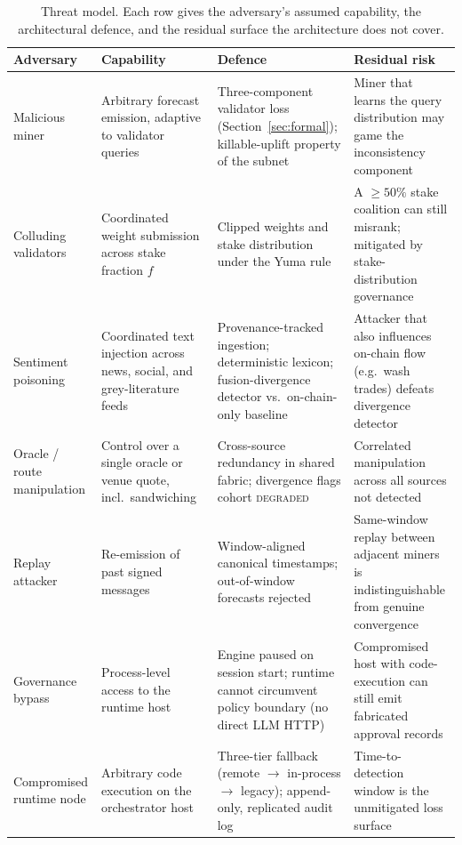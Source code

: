 \documentclass[11pt,a4paper]{article}
\begin{document}
\begin{table}[ht]
\centering
\footnotesize
\caption{Threat model. Each row gives the adversary's assumed
capability, the architectural defence, and the residual surface the
architecture does not cover.}
\label{tab:threat-model}
\renewcommand{\arraystretch}{1.15}
\begin{tabularx}{\linewidth}{@{}l Y Y Y@{}}
\toprule
\textbf{Adversary} & \textbf{Capability} & \textbf{Defence} &
\textbf{Residual risk} \\
\midrule
Malicious miner & Arbitrary forecast emission, adaptive to validator
queries & Three-component validator loss
(Section~\ref{sec:formal}); killable-uplift property of the subnet
& Miner that learns the query distribution may game the inconsistency
component \\
Colluding validators & Coordinated weight submission across stake
fraction $f$ & Clipped weights and stake distribution under the Yuma
rule & A $\geq 50\%$ stake coalition can still misrank; mitigated by
stake-distribution governance \\
Sentiment poisoning & Coordinated text injection across news, social,
and grey-literature feeds & Provenance-tracked ingestion;
deterministic lexicon; fusion-divergence detector vs.\ on-chain-only
baseline & Attacker that also influences on-chain flow (e.g.\ wash
trades) defeats divergence detector~\cite{cong2022crypto} \\
Oracle / route manipulation & Control over a single oracle or venue
quote, incl.\ sandwiching~\cite{daian2020flash} & Cross-source
redundancy in shared fabric; divergence flags cohort
\textsc{degraded} & Correlated manipulation across all sources not
detected \\
Replay attacker & Re-emission of past signed messages
& Window-aligned canonical timestamps; out-of-window forecasts
rejected & Same-window replay between adjacent miners is
indistinguishable from genuine convergence \\
Governance bypass & Process-level access to the runtime host
& Engine paused on session start; runtime cannot circumvent policy
boundary (no direct LLM HTTP) & Compromised host with code-execution
can still emit fabricated approval records \\
Compromised runtime node & Arbitrary code execution on the
orchestrator host & Three-tier fallback (remote $\to$ in-process
$\to$ legacy); append-only, replicated audit log & Time-to-detection
window is the unmitigated loss surface \\
\bottomrule
\end{tabularx}
\end{table}
\end{document}
